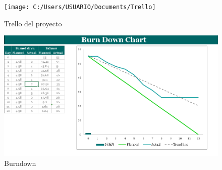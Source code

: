 \begin{figure}
	\centering
	\texttt{[image: C:/Users/USUARIO/Documents/Trello]}
	\caption[Figura 1]{Trello del proyecto}
	\label{fig:trello}
\end{figure}

\begin{figure}
	\centering
	\includegraphics[width=1.2\linewidth]{img/Burndown}
	\caption[Figura 2]{Burndown}
	\label{fig:burndown}
\end{figure}



